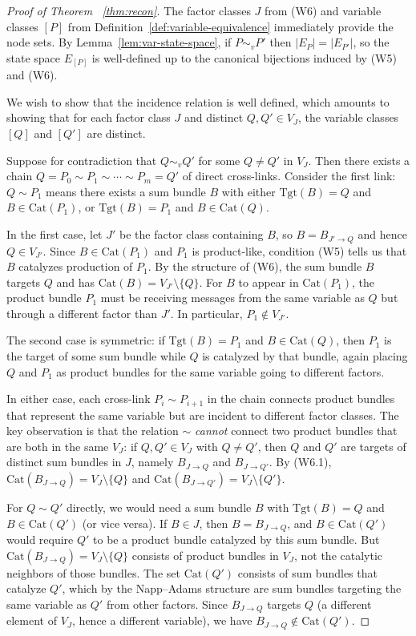 \documentclass{article}
\theoremstyle{plain}
\theoremstyle{definition}
\theoremstyle{remark}
\newcommand{\Cat}{\textrm{Cat}}
\newcommand{\<}{\langle}
\newcommand{\tgt}{\textrm{Tgt}}
\renewcommand{\>}{\rangle}
\begin{document}
\begin{proof}[Proof of Theorem ~\ref{thm:recon}]
The factor classes $J$ from (W6) and variable classes $[P]$ from 
Definition~\ref{def:variable-equivalence} immediately provide the node sets. 
By Lemma~\ref{lem:var-state-space}, if $P \sim_v P'$ then $|E_P| = |E_{P'}|$, 
so the state space $E_{[P]}$ is well-defined up to the canonical bijections 
induced by (W5) and (W6).

We wish to show that the incidence relation is well defined, 
which amounts to showing that for each factor class $J$ and distinct 
$Q, Q' \in V_J$, the variable classes $[Q]$ and $[Q']$ are distinct.

Suppose for contradiction that $Q \sim_v Q'$ for some $Q \neq Q'$ in $V_J$. 
Then there exists a chain $Q = P_0 \sim P_1 \sim \cdots \sim P_m = Q'$ of 
direct cross-links. Consider the first link: $Q \sim P_1$ means there exists 
a sum bundle $B$ with either $\tgt(B) = Q$ and $B \in \Cat(P_1)$, or 
$\tgt(B) = P_1$ and $B \in \Cat(Q)$.

In the first case, let $J'$ be the factor class containing $B$, so 
$B = B_{J' \to Q}$ and hence $Q \in V_{J'}$. Since $B \in \Cat(P_1)$ and 
$P_1$ is product-like, condition (W5) tells us that $B$ catalyzes production 
of $P_1$. By the structure of (W6), the sum bundle $B$ targets $Q$ and has 
$\Cat(B) = V_{J'} \setminus \{Q\}$. For $B$ to appear in $\Cat(P_1)$, the 
product bundle $P_1$ must be receiving messages from the same variable as $Q$ 
but through a different factor than $J'$. In particular, $P_1 \notin V_{J'}$.

The second case is symmetric: if $\tgt(B) = P_1$ and $B \in \Cat(Q)$, then 
$P_1$ is the target of some sum bundle while $Q$ is catalyzed by that bundle, 
again placing $Q$ and $P_1$ as product bundles for the same variable going 
to different factors.

In either case, each cross-link $P_i \sim P_{i+1}$ in the chain connects 
product bundles that represent the same variable but are incident to different 
factor classes. The key observation is that the relation $\sim$ \emph{cannot} 
connect two product bundles that are both in the same $V_J$: if $Q, Q' \in V_J$ 
with $Q \neq Q'$, then $Q$ and $Q'$ are targets of distinct sum bundles in $J$, 
namely $B_{J \to Q}$ and $B_{J \to Q'}$. By (W6.1), 
$\Cat(B_{J \to Q}) = V_J \setminus \{Q\}$ and 
$\Cat(B_{J \to Q'}) = V_J \setminus \{Q'\}$.

For $Q \sim Q'$ directly, we would need a sum bundle $B$ with $\tgt(B) = Q$ 
and $B \in \Cat(Q')$ (or vice versa). If $B \in J$, then $B = B_{J \to Q}$, 
and $B \in \Cat(Q')$ would require $Q'$ to be a product bundle catalyzed by 
this sum bundle. But $\Cat(B_{J \to Q}) = V_J \setminus \{Q\}$ consists of 
product bundles in $V_J$, not the catalytic neighbors of those bundles. 
The set $\Cat(Q')$ consists of sum bundles that catalyze $Q'$, which by the 
Napp--Adams structure are sum bundles targeting the same variable as $Q'$ 
from other factors. Since $B_{J \to Q}$ targets $Q$ (a different element of 
$V_J$, hence a different variable), we have $B_{J \to Q} \notin \Cat(Q')$.


\end{proof}
\end{document}
